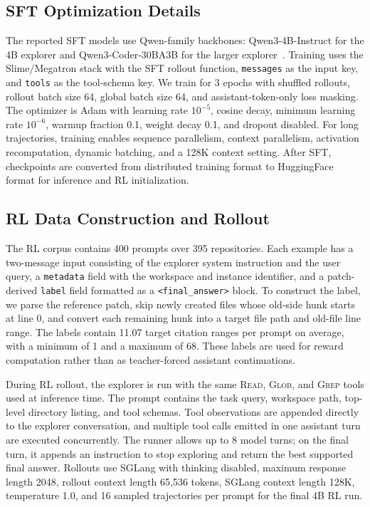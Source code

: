 \subsection{SFT Optimization Details}
\label{app:sft-optimization}

The reported SFT models use Qwen-family backbones: Qwen3-4B-Instruct for the 4B explorer and Qwen3-Coder-30BA3B for the larger explorer~\cite{qwen3}.
Training uses the Slime/Megatron stack with the SFT rollout function, \texttt{messages} as the input key, and \texttt{tools} as the tool-schema key.
We train for 3 epochs with shuffled rollouts, rollout batch size 64, global batch size 64, and assistant-token-only loss masking.
The optimizer is Adam with learning rate $10^{-5}$, cosine decay, minimum learning rate $10^{-6}$, warmup fraction 0.1, weight decay 0.1, and dropout disabled.
For long trajectories, training enables sequence parallelism, context parallelism, activation recomputation, dynamic batching, and a 128K context setting.
After SFT, checkpoints are converted from distributed training format to HuggingFace format for inference and RL initialization.



\subsection{RL Data Construction and Rollout}
\label{app:rl-data}

The RL corpus contains 400 prompts over 395 repositories.
Each example has a two-message input consisting of the explorer system instruction and the user query, a \texttt{metadata} field with the workspace and instance identifier, and a patch-derived \texttt{label} field formatted as a \texttt{<final\_answer>} block.
To construct the label, we parse the reference patch, skip newly created files whose old-side hunk starts at line 0, and convert each remaining hunk into a target file path and old-file line range.
The labels contain 11.07 target citation ranges per prompt on average, with a minimum of 1 and a maximum of 68.
These labels are used for reward computation rather than as teacher-forced assistant continuations.

During RL rollout, the explorer is run with the same \textsc{Read}, \textsc{Glob}, and \textsc{Grep} tools used at inference time.
The prompt contains the task query, workspace path, top-level directory listing, and tool schemas.
Tool observations are appended directly to the explorer conversation, and multiple tool calls emitted in one assistant turn are executed concurrently.
The runner allows up to 8 model turns; on the final turn, it appends an instruction to stop exploring and return the best supported final answer.
Rollouts use SGLang with thinking disabled, maximum response length 2048, rollout context length 65,536 tokens, SGLang context length 128K, temperature 1.0, and 16 sampled trajectories per prompt for the final 4B RL run.

